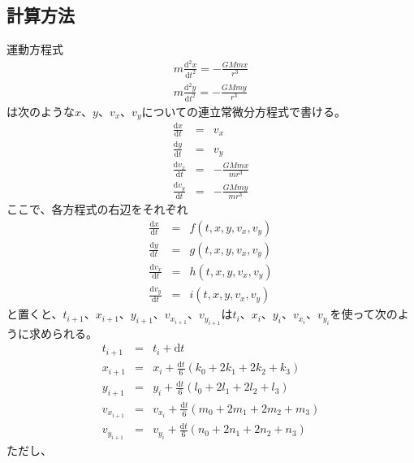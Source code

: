 \documentclass[a4paper,twoside]{jarticle}
\begin{document}
\subsection{計算方法}
運動方程式
\begin{eqnarray}
  m\frac{\mathrm{d}^2 x}{\mathrm{d}t^2}=-\frac{GMmx}{r^3}\\
  m\frac{\mathrm{d}^2 y}{\mathrm{d}t^2}=-\frac{GMmy}{r^3}
\end{eqnarray}
は次のような$x$、$y$、$v_x$、$v_y$についての連立常微分方程式で書ける。
\begin{eqnarray}
  \frac{\mathrm{d}x}{\mathrm{d}t}&=&v_x\\
  \frac{\mathrm{d}y}{\mathrm{d}t}&=&v_y\\
  \frac{\mathrm{d}v_x}{\mathrm{d}t}&=&-\frac{GMmx}{mr^3}\\
  \frac{\mathrm{d}v_y}{\mathrm{d}t}&=&-\frac{GMmy}{mr^3}
\end{eqnarray}
ここで、各方程式の右辺をそれぞれ
\begin{eqnarray}
  \frac{\mathrm{d}x}{\mathrm{d}t}&=&f\left(t,x,y,v_x,v_y\right)\\
  \frac{\mathrm{d}y}{\mathrm{d}t}&=&g\left(t,x,y,v_x,v_y\right)\\
  \frac{\mathrm{d}v_x}{\mathrm{d}t}&=&h\left(t,x,y,v_x,v_y\right)\\
  \frac{\mathrm{d}v_y}{\mathrm{d}t}&=&i\left(t,x,y,v_x,v_y\right)
\end{eqnarray}
と置くと、$t_{i+1}$、$x_{i+1}$、$y_{i+1}$、$v_{x_{i+1}}$、$v_{y_{i+1}}$は$t_{i}$、$x_{i}$、$y_{i}$、$v_{x_{i}}$、$v_{y_{i}}$を使って次のように求められる。
\begin{eqnarray}
  t_{i+1}&=&t_{i}+\mathrm{d}t\\
  x_{i+1}&=&x_{i}+\frac{\mathrm{d}t}{6}\left(k_0+2k_1+2k_2+k_3\right)\\
  y_{i+1}&=&y_{i}+\frac{\mathrm{d}t}{6}\left(l_0+2l_1+2l_2+l_3\right)\\
  v_{x_{i+1}}&=&v_{x_{i}}+\frac{\mathrm{d}t}{6}\left(m_0+2m_1+2m_2+m_3\right)\\
  v_{y_{i+1}}&=&v_{y_{i}}+\frac{\mathrm{d}t}{6}\left(n_0+2n_1+2n_2+n_3\right)
\end{eqnarray}
ただし、
\end{document}
